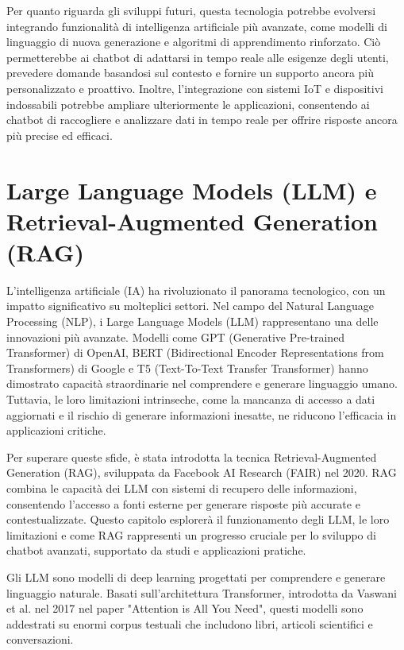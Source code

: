 \documentclass[a4paper,twoside,12pt]{toptesi}
\begin{document}
Per quanto riguarda gli sviluppi futuri, questa tecnologia potrebbe evolversi integrando funzionalità di intelligenza artificiale più avanzate, come modelli di linguaggio di nuova generazione e algoritmi di apprendimento rinforzato. Ciò permetterebbe ai chatbot di adattarsi in tempo reale alle esigenze degli utenti, prevedere domande basandosi sul contesto e fornire un supporto ancora più personalizzato e proattivo. Inoltre, l'integrazione con sistemi IoT e dispositivi indossabili potrebbe ampliare ulteriormente le applicazioni, consentendo ai chatbot di raccogliere e analizzare dati in tempo reale per offrire risposte ancora più precise ed efficaci.

\chapter{Large Language Models (LLM) e Retrieval-Augmented Generation (RAG)}
L'intelligenza artificiale (IA) ha rivoluzionato il panorama tecnologico, con un impatto significativo su molteplici settori. Nel campo del Natural Language Processing (NLP), i Large Language Models (LLM) rappresentano una delle innovazioni più avanzate. Modelli come GPT (Generative Pre-trained Transformer) di OpenAI, BERT (Bidirectional Encoder Representations from Transformers) di Google e T5 (Text-To-Text Transfer Transformer) hanno dimostrato capacità straordinarie nel comprendere e generare linguaggio umano. Tuttavia, le loro limitazioni intrinseche, come la mancanza di accesso a dati aggiornati e il rischio di generare informazioni inesatte, ne riducono l'efficacia in applicazioni critiche.

Per superare queste sfide, è stata introdotta la tecnica Retrieval-Augmented Generation (RAG), sviluppata da Facebook AI Research (FAIR) nel 2020. RAG combina le capacità dei LLM con sistemi di recupero delle informazioni, consentendo l'accesso a fonti esterne per generare risposte più accurate e contestualizzate. Questo capitolo esplorerà il funzionamento degli LLM, le loro limitazioni e come RAG rappresenti un progresso cruciale per lo sviluppo di chatbot avanzati, supportato da studi e applicazioni pratiche.

Gli LLM sono modelli di deep learning progettati per comprendere e generare linguaggio naturale. Basati sull'architettura Transformer, introdotta da Vaswani et al. nel 2017 nel paper "Attention is All You Need", questi modelli sono addestrati su enormi corpus testuali che includono libri, articoli scientifici e conversazioni.
\end{document}
